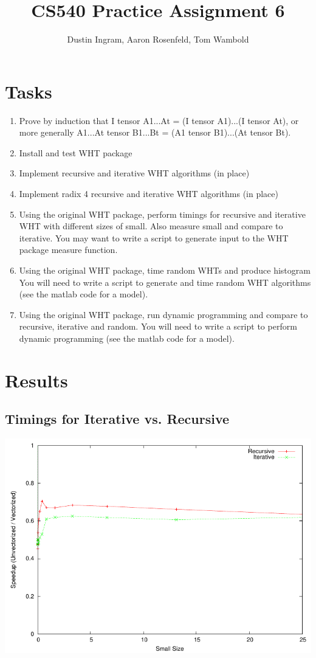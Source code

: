 \documentclass{article}
\title{CS540 Practice Assignment 6}
\author{Dustin Ingram, Aaron Rosenfeld, Tom Wambold}
\begin{document}
\maketitle
\newpage
\section{Tasks}
\begin{enumerate}
    \item Prove by induction that I tensor A1...At = (I tensor A1)...(I tensor At), or more generally A1...At tensor B1...Bt = (A1 tensor B1)...(At tensor Bt).
    \item Install and test WHT package
    \item Implement recursive and iterative WHT algorithms (in place)
    \item Implement radix 4 recursive and iterative WHT algorithms (in place)
    \item Using the original WHT package, perform timings for recursive and iterative WHT with different sizes of small. Also measure small and compare to iterative. You may want to write a script to generate input to the WHT package measure function.
    \item Using the original WHT package, time random WHTs and produce histogram You will need to write a script to generate and time random WHT algorithms (see the matlab code for a model).
    \item Using the original WHT package, run dynamic programming and compare to recursive, iterative and random. You will need to write a script to perform dynamic programming (see the matlab code for a model).
\end{enumerate}
\newpage
\section{Results}
\subsection{Timings for Iterative vs. Recursive}
  \includegraphics[width=\textwidth]{p6.pdf}
\end{document}
